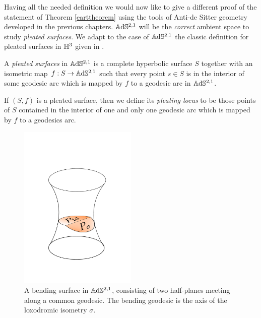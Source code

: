Having all the needed definition we would now like to give a different proof of the statement of Theorem \ref{earttheorem} using the tools of Anti-de Sitter geometry developed in the previous chapters. $\mathbb{A}\mathrm{d}\mathbb{S}^{2,1}$ will be the \textit{correct} ambient space to study \textit{pleated surfaces}. We adapt to the case of $\mathbb{A}\mathrm{d}\mathbb{S}^{2,1}$ the classic definition for pleated surfaces in $\mathbb{H}^3$ given in \cite{canary2006fundamentals}. 

\begin{definition}
    A \textit{pleated surfaces} in $\mathbb{A}\mathrm{d}\mathbb{S}^{2,1}$ is a complete hyperbolic surface $S$ together with an isometric map $f:S\to\mathbb{A}\mathrm{d}\mathbb{S}^{2,1}$ such that every point $s\in S$ is in the interior of some geodesic arc which is mapped by $f$ to a geodesic arc in $\mathbb{A}\mathrm{d}\mathbb{S}^{2,1}$. 
\end{definition}

\begin{definition}
    If $(S,f)$ is a pleated surface, then we define its \textit{pleating locus} to be those points of $S$ contained in the interior of one and only one geodesic arc which is mapped by $f$ to a geodesics arc.   
\end{definition}

\begin{figure}
    \centering
    \includegraphics[width=0.5\textwidth]{bendinglocus.pdf}
    \caption{A bending surface in $\mathbb{A}\mathrm{d}\mathbb{S}^{2,1}$, consisting of two half-planes meeting along a common geodesic. The bending geodesic is the axis of the loxodromic isometry $\sigma$.}
    \label{pleatedinho}
\end{figure}

